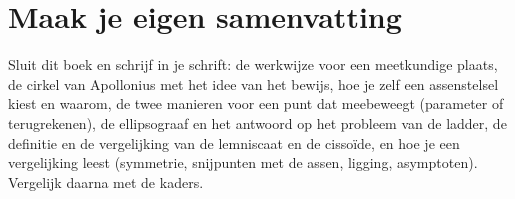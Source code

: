 
\ifzelfstudie
\section*{Maak je eigen samenvatting}
Sluit dit boek en schrijf in je schrift: de werkwijze voor een meetkundige plaats, de cirkel van Apollonius met het idee van het bewijs, hoe je zelf een assenstelsel kiest en waarom, de twee manieren voor een punt dat meebeweegt (parameter of terugrekenen), de ellipsograaf en het antwoord op het probleem van de ladder, de definitie en de vergelijking van de lemniscaat en de cissoïde, en hoe je een vergelijking leest (symmetrie, snijpunten met de assen, ligging, asymptoten). Vergelijk daarna met de kaders.
\fi
